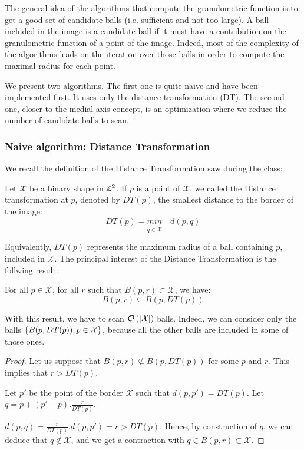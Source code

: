 The general idea of the algorithms that compute the granulometric function is to get a good set of candidate balls (i.e. sufficient and not too large). A ball included in the image is a candidate ball if it must have a contribution on the granulometric function of a point of the image. Indeed, most of the complexity of the algorithms leads on the iteration over those balls in order to compute the maximal radius for each point. 

We present two algorithms. The first one is quite naive and have been implemented first. It uses only the distance transformation (DT). The second one, closer to the medial axis concept, is an optimization where we reduce the number of candidate balls to scan.

\subsubsection{Naive algorithm: Distance Transformation}

We recall the definition of the Distance Transformation saw during the class:

\begin{definition}
Let $\mathcal{X}$ be a binary shape in $\mathbb{Z}^{2}$. If $p$ is a point of $\mathcal{X}$, we called the Distance transformation at $p$, denoted by $DT(p)$, the smallest distance to the border of the image:
$$ DT(p) = \underset{q \in \widetilde{\mathcal{X}}}{min} \quad d(p,q) $$
\end{definition}

Equivalently, $DT(p)$ represents the maximum radius of a ball containing $p$, included in $\mathcal{X}$. The principal interest of the Distance Transformation is the follwing result:

\begin{theoreme}
	For all $p \in \mathcal{X}$, for all $r$ such that $B(p,r) \subset \mathcal{X}$, we have:
		$$ B(p,r) \subseteq B(p,DT(p))$$
\label{theoremDT}
\end{theoreme}

With this result, we have to scan $\mathcal O \left( \left| \mathcal{X} \right| \right)$ balls. Indeed, we can consider only the balls $\left\{ B(p,DT(p)), p \in \mathcal{X} \right\}$, because all the other balls are included in some of those ones.

\begin{proof}
	
Let us suppose that $B(p,r) \nsubseteq B(p,DT(p))$ for some $p$ and $r$. This implies that $r > DT(p)$.

Let $p'$ be the point of the border $\widetilde{\mathcal{X}}$ such that $d(p,p') = DT(p)$. Let $q = p + (p'-p).\frac{r}{DT(p)}.$ 

$d(p,q) = \frac{r}{DT(p)}.d(p,p') = r > DT(p)$. Hence, by construction of $q$, we can deduce that $q \notin \mathcal{X}$, and we get a contraction with $q \in B(p,r) \subset \mathcal{X}$. 

\end{proof}

